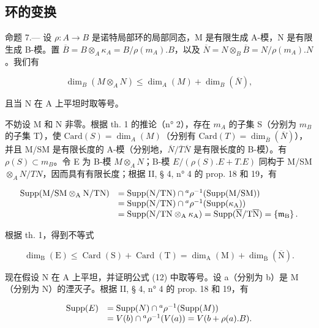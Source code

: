 \subsection{环的变换}

命题 7.--- 设 \(\rho: A \to B\) 是诺特局部环的局部同态，M 是有限生成 A-模，N 是有限生成 B-模。置 \(\overline{B} = B \otimes_A \kappa_A = B / \rho(m_A).B\)，以及 \(\overline{N} = N \otimes_B \overline{B} = N / \rho(m_A).N\)。我们有

\[
\dim_ {B} (M \otimes_ {A} N) \leqslant \dim_ {A} (M) + \dim_ {B} (\overline {{N}}),\tag{12}
\]

且当 N 在 A 上平坦时取等号。

不妨设 M 和 N 非零。根据 th. 1 的推论（n° 2），存在 \(m_A\) 的子集 S（分别为 \(m_B\) 的子集 T），使 \(\text{Card}(S) = \dim_A(M)\)（分别有 \(\text{Card}(T) = \dim_{\overline{B}}(\overline{N})\)），并且 M/SM 是有限长度的 A-模（分别地，\(\overline{N}/\overline{T}\overline{N}\) 是有限长度的 B-模）。有 \(\rho(S) \subset m_B\)。令 E 为 B-模 \(M \otimes_A N\)；B-模 \(E/(\rho(S).E + T.E)\) 同构于 M/SM \(\otimes_A N/TN\)，因而具有有限长度；根据 II, § 4, n° 4 的 prop. 18 和 19，有

\[
\begin{array}{r l} \operatorname{Supp} (\mathrm{M} / \mathrm{SM} \otimes_ {\mathrm{A}} \mathrm{N} / \mathrm{TN}) & = \operatorname{Supp} (\mathrm{N} / \mathrm{TN}) \cap {} ^ {a} \rho^ {- 1} (\operatorname{Supp} (\mathrm{M} / \mathrm{SM})) \\ & = \operatorname{Supp} (\mathrm{N} / \mathrm{TN}) \cap {} ^ {a} \rho^ {- 1} (\operatorname{Supp} (\kappa_ {\mathrm{A}})) \\ & = \operatorname{Supp} (\mathrm{N} / \mathrm{TN} \otimes_ {\mathrm{A}} \kappa_ {\mathrm{A}}) = \operatorname{Supp} (\overline {{\mathrm{N}}} / \mathrm{T} \overline {{\mathrm{N}}}) = \left\{\mathfrak {m} _ {\mathrm{B}} \right\}. \end{array}
\]

根据 th. 1，得到不等式

\[
\dim_ {\mathrm{B}} (\mathrm{E}) \leqslant \operatorname{Card} (\mathrm{S}) + \operatorname{Card} (\mathrm{T}) = \dim_ {\mathrm{A}} (\mathrm{M}) + \dim_ {\overline {{\mathrm{B}}}} (\overline {{\mathrm{N}}}).
\]

现在假设 N 在 A 上平坦，并证明公式 (12) 中取等号。设 a（分别为 b）是 M（分别为 N）的湮灭子。根据 II, § 4, n° 4 的 prop. 18 和 19，有

\[
\begin{array}{r l} \operatorname{Supp} (E) & = \operatorname{Supp} (N) \cap {} ^ {a} \rho^ {- 1} (\operatorname{Supp} (M)) \\ & = V (b) \cap {} ^ {a} \rho^ {- 1} (V (a)) = V (b + \rho (a). B). \end{array}
\]

